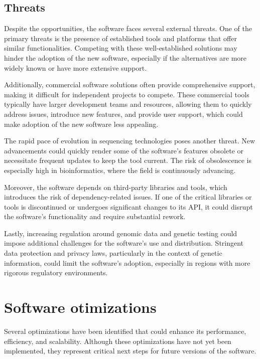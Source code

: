 \subsection{Threats}

Despite the opportunities, the software faces several external threats. One of the primary threats is the presence of established tools and platforms that offer similar functionalities. Competing with these well-established solutions may hinder the adoption of the new software, especially if the alternatives are more widely known or have more extensive support.

Additionally, commercial software solutions often provide comprehensive support, making it difficult for independent projects to compete. These commercial tools typically have larger development teams and resources, allowing them to quickly address issues, introduce new features, and provide user support, which could make adoption of the new software less appealing.

The rapid pace of evolution in sequencing technologies poses another threat. New advancements could quickly render some of the software's features obsolete or necessitate frequent updates to keep the tool current. The risk of obsolescence is especially high in bioinformatics, where the field is continuously advancing.

Moreover, the software depends on third-party libraries and tools, which introduces the risk of dependency-related issues. If one of the critical libraries or tools is discontinued or undergoes significant changes to its API, it could disrupt the software's functionality and require substantial rework.

Lastly, increasing regulation around genomic data and genetic testing could impose additional challenges for the software's use and distribution. Stringent data protection and privacy laws, particularly in the context of genetic information, could limit the software's adoption, especially in regions with more rigorous regulatory environments.



\section{Software otimizations} \label{sec:software_optimizations}

Several optimizations have been identified that could enhance its performance, efficiency, and scalability. Although these optimizations have not yet been implemented, they represent critical next steps for future versions of the software.

